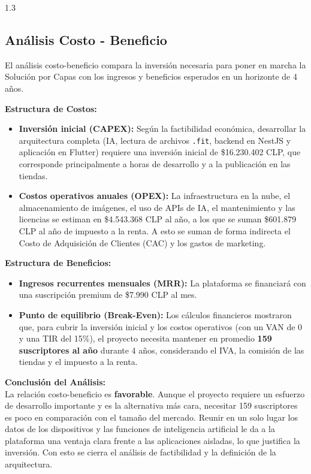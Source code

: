 \begin{spacing}{1.3}
\subsection{Análisis Costo - Beneficio}
El análisis costo-beneficio compara la inversión necesaria para poner en marcha la Solución por Capas con los ingresos y beneficios esperados en un horizonte de 4 años.

\textbf{Estructura de Costos:}
\begin{itemize}
    \item \textbf{Inversión inicial (CAPEX):} Según la factibilidad económica, desarrollar la arquitectura completa (IA, lectura de archivos \texttt{.fit}, backend en NestJS y aplicación en Flutter) requiere una inversión inicial de \$16.230.402 CLP, que corresponde principalmente a horas de desarrollo y a la publicación en las tiendas.
    \item \textbf{Costos operativos anuales (OPEX):} La infraestructura en la nube, el almacenamiento de imágenes, el uso de APIs de IA, el mantenimiento y las licencias se estiman en \$4.543.368 CLP al año, a los que se suman \$601.879 CLP al año de impuesto a la renta. A esto se suman de forma indirecta el Costo de Adquisición de Clientes (CAC) y los gastos de marketing.
\end{itemize}

\textbf{Estructura de Beneficios:}
\begin{itemize}
    \item \textbf{Ingresos recurrentes mensuales (MRR):} La plataforma se financiará con una suscripción premium de \$7.990 CLP al mes.
    \item \textbf{Punto de equilibrio (Break-Even):} Los cálculos financieros mostraron que, para cubrir la inversión inicial y los costos operativos (con un VAN de 0 y una TIR del 15\%), el proyecto necesita mantener en promedio \textbf{159 suscriptores al año} durante 4 años, considerando el IVA, la comisión de las tiendas y el impuesto a la renta.
\end{itemize}
\newpage
\textbf{Conclusión del Análisis:}\\
La relación costo-beneficio es \textbf{favorable}. Aunque el proyecto requiere un esfuerzo de desarrollo importante y es la alternativa más cara, necesitar 159 suscriptores es poco en comparación con el tamaño del mercado. Reunir en un solo lugar los datos de los dispositivos y las funciones de inteligencia artificial le da a la plataforma una ventaja clara frente a las aplicaciones aisladas, lo que justifica la inversión. Con esto se cierra el análisis de factibilidad y la definición de la arquitectura.
\end{spacing}
